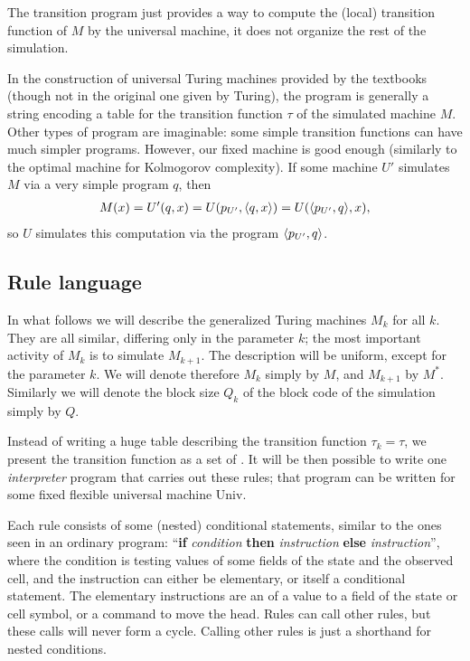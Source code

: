 \documentclass[11pt]{memoir}
\theoremstyle{definition} %
\newcommand{\Q}{Q}
\newcommand{\Un}{\mathrm{Univ}}
\begin{document}
The transition program just provides a way to compute
the (local) transition function of \( M \) by the universal machine,
it does not organize the rest of the simulation.

\begin{remark}
 In the construction of universal Turing machines provided by the textbooks
(though not in the original one given by Turing), the program is generally a string
encoding a table for the transition
function \( \tau \) of the simulated machine \( M \).
Other types of program are imaginable: some simple transition functions can
have much simpler programs.
However, our fixed machine is good enough (similarly to the optimal machine
for Kolmogorov complexity).
If some machine \( U' \) simulates \( M \) via a
very simple program \( q \), then
 \begin{align*}
     M(x)=U'(q,x) = U(p_{U'},{\mathopen\langle q,x\mathclose\rangle}) = U({\mathopen\langle p_{U'},q\mathclose\rangle},x),
 \end{align*}
so \( U \) simulates this computation via the program \( {\mathopen\langle p_{U'},q\mathclose\rangle} \).
\end{remark}

\subsection{Rule language}\label{sec:language}

In what follows we will describe the generalized Turing machines \( M_{k} \) for all \( k \).
They are all similar, differing only in the parameter \( k \); the most important activity
of \( M_{k} \) is to simulate \( M_{k+1} \).
The description will be uniform, except for the parameter \( k \).
We will denote therefore \( M_{k} \) simply by \( M \), and \( M_{k+1} \)  by \( M^{*} \).
Similarly we will denote the block size \( \Q_{k} \) of the block code of the 
simulation simply by \( \Q \).

Instead of writing a huge table describing the transition function \( \tau_{k}=\tau \),
we present the transition function as a set of .
It will be then possible to write one \emph{interpreter} program that carries
out these rules; that program can be written for some fixed flexible 
universal machine \( \Un \).

Each rule consists of some (nested) conditional statements,
similar to the ones seen in an ordinary program:
 ``\textbf{if} \textit{condition} \textbf{then} \textit{instruction}
\textbf{else} \textit{instruction}'', 
where the condition
is testing values of some fields of the state and the observed cell, and
the instruction can either be elementary, or itself a conditional statement. 
The elementary instructions are an  of a value to a field
of the state or cell symbol, or a command to move the head.
Rules can call other rules, but these calls will never form a cycle.
Calling other rules is just a shorthand for nested conditions.
\end{document}
